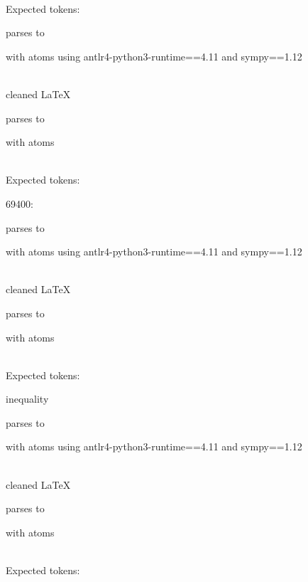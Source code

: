 \documentclass{article}
\begin{document}
\ \\
Expected tokens:



\hrulefill


parses to

with atoms
using antlr4-python3-runtime==4.11 and sympy==1.12

\ \\
cleaned \LaTeX

parses to

with atoms


\ \\
Expected tokens:


\hrulefill

69400:

parses to

with atoms
using antlr4-python3-runtime==4.11 and sympy==1.12

\ \\
cleaned \LaTeX

parses to

with atoms


\ \\
Expected tokens:



\hrulefill

inequality

parses to

with atoms
using antlr4-python3-runtime==4.11 and sympy==1.12

\ \\
cleaned \LaTeX

parses to

with atoms


\ \\
Expected tokens:

\end{document}
